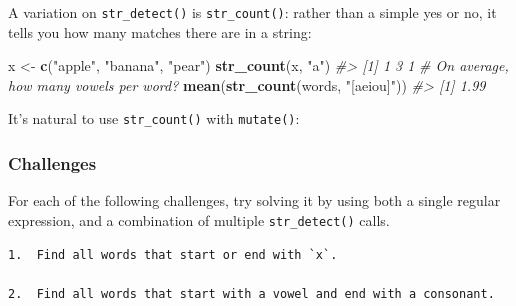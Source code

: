\documentclass[]{book}
\newenvironment{Shaded}{\begin{snugshade}}{\end{snugshade}}
\newcommand{\KeywordTok}[1]{\textcolor[rgb]{0.13,0.29,0.53}{\textbf{#1}}}
\newcommand{\DataTypeTok}[1]{\textcolor[rgb]{0.13,0.29,0.53}{#1}}
\newcommand{\StringTok}[1]{\textcolor[rgb]{0.31,0.60,0.02}{#1}}
\newcommand{\CommentTok}[1]{\textcolor[rgb]{0.56,0.35,0.01}{\textit{#1}}}
\newcommand{\OperatorTok}[1]{\textcolor[rgb]{0.81,0.36,0.00}{\textbf{#1}}}
\newcommand{\NormalTok}[1]{#1}
\begin{document}
A variation on \texttt{str\_detect()} is \texttt{str\_count()}: rather
than a simple yes or no, it tells you how many matches there are in a
string:

\begin{Shaded}
\begin{Highlighting}[]
\NormalTok{x <-}\StringTok{ }\KeywordTok{c}\NormalTok{(}\StringTok{"apple"}\NormalTok{, }\StringTok{"banana"}\NormalTok{, }\StringTok{"pear"}\NormalTok{)}
\KeywordTok{str_count}\NormalTok{(x, }\StringTok{"a"}\NormalTok{)}
\CommentTok{#> [1] 1 3 1}
\CommentTok{# On average, how many vowels per word?}
\KeywordTok{mean}\NormalTok{(}\KeywordTok{str_count}\NormalTok{(words, }\StringTok{"[aeiou]"}\NormalTok{))}
\CommentTok{#> [1] 1.99}
\end{Highlighting}
\end{Shaded}

It's natural to use \texttt{str\_count()} with \texttt{mutate()}:

\begin{Shaded}
\end{Shaded}

\subsubsection*{Challenges}\label{challenges-17}

For each of the following challenges, try solving it by using both a
single regular expression, and a combination of multiple
\texttt{str\_detect()} calls.

\begin{verbatim}
1.  Find all words that start or end with `x`.

2.  Find all words that start with a vowel and end with a consonant.
\end{verbatim}
\end{document}

